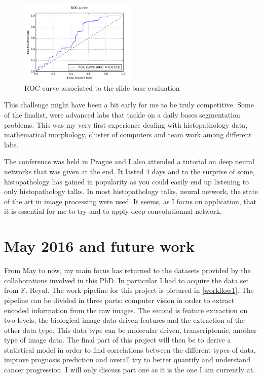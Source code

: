 \documentclass[a4paper,10pt]{article}
\begin{document}
\begin{figure}[!ht]
\centering
\includegraphics[width=0.5\textwidth]{ROC.png}
\caption{ROC curve associated to the slide base evaluation}
\label{Eval: ROC}
\end{figure}

This challenge might have been a bit early for me to be truly competitive. Some of the finalist, were advanced labs that tackle on a daily bases segmentation problems. This was my very first experience dealing with histopathology data, mathematical morphology, cluster of computers and team work among different labs. 

The conference was held in Prague and I also attended a tutorial on deep neural networks that was given at the end. It lasted 4 days and to the surprise of some, histopathology has gained in popularity as you could easily end up listening to only histopathology talks. In most histopathology talks, neural network, the state of the art in image processing were used. It seems, as I focus on application, that it is essential for me to try and to apply deep convolutionnal network.


\section{May 2016 and future work}
From May to now, my main focus has returned to the datasets provided by the collaborations involved in this PhD. In particular I had to acquire the data set from F. Reyal. The work pipeline for this project is pictured in \ref{workflow1}. The pipeline can be divided in three parts: computer vision in order to extract encoded information from the raw images. The second is feature extraction on two levels, the biological image data driven features and the extraction of the other data type. This data type can be molecular driven, transcriptomic, another type of image data. The final part of this project will then be to derive a statistical model in order to find correlations between the different types of data, improve prognosis prediction and overall try to better quantify and understand cancer progression. I will only discuss part one as it is the one I am currently at.
\end{document}

